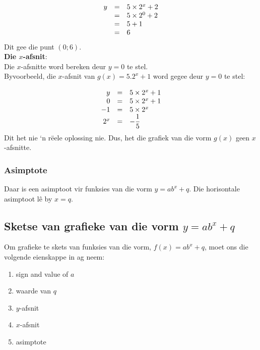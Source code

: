 \begin{equation*}
\begin{array}{ccl}\hfill y& =& 5 \times 2^{x}+2\hfill \\
 \hfill & =& 5 \times 2^{0}+2\hfill \\
 & =& 5+1\hfill \\ & =& 6\hfill 
\end{array}
\end{equation*}
Dit gee die punt $(0;6)$.\vspace{10pt}
\\
\textbf{Die $x$-afsnit}:\\
Die $x$-afsnitte word bereken deur $y=0$ te stel. \\
Byvoorbeeld, die $x$-afsnit van $g(x)=5.2^{x}+1$ word gegee deur $y=0$ te stel:\par 
\begin{equation*}
\begin{array}{ccl}\hfill y& =& 5 \times 2^{x}+1\hfill \\
 \hfill 0& =& 5 \times 2^{x}+1\hfill \\
 \hfill -1& =& 5 \times 2^{x}\hfill \\
 \hfill {2}^{x}& =& -\dfrac{1}{5}\hfill 
\end{array}
\end{equation*}
Dit het nie ‘n rëele oplossing nie. Dus, het die grafiek van die vorm $g(x)$ geen $x$-afsnitte.\par 

\subsubsection*{Asimptote}

Daar is een asimptoot vir funksies van die vorm $y=ab^{x}+q$. Die horisontale asimptoot lê by $x=q$. 


\subsection*{Sketse van grafieke van die vorm $y=ab^{x}+q$}

Om grafieke te skets van funksies van die vorm, $f(x)=ab^{x}+q$, moet ons die volgende eienskappe in ag neem:\par 
\begin{enumerate}[noitemsep, label=\textbf{\arabic*}. ] 
\item sign and value of $a$ 
\item waarde van $q$
\item $y$-afsnit
\item $x$-afsnit
\item asimptote
\end{enumerate}

